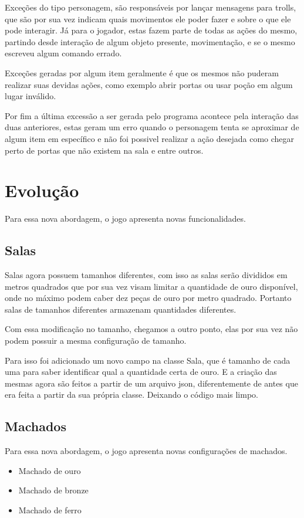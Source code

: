 \documentclass[runningheads,a4paper]{llncs}
\begin{document}
		Exceções do tipo personagem, são responsáveis por lançar mensagens para trolls, que são por sua vez indicam quais movimentos ele poder fazer e sobre o que ele pode interagir. Já para o jogador, estas fazem parte de todas as ações do mesmo, partindo desde interação de algum objeto presente, movimentação, e se o mesmo escreveu algum comando errado.
		
		Exceções geradas por algum item geralmente é que os mesmos não puderam realizar suas devidas ações, como exemplo abrir portas ou usar poção em algum lugar inválido.
		
		Por fim a última excessão a ser gerada pelo programa acontece pela interação das duas anteriores, estas geram um erro quando o personagem tenta se aproximar de algum item em específico e não foi possivel realizar a ação desejada como chegar perto de portas que não existem na sala e entre outros.

\section{Evolução}
	Para essa nova abordagem, o jogo apresenta novas funcionalidades.
	
	\subsection{Salas}
		Salas agora possuem tamanhos diferentes, com isso as salas serão divididos em metros quadrados que por sua vez visam limitar a quantidade de ouro disponível, onde no máximo podem caber dez peças de ouro por metro quadrado. Portanto salas de tamanhos diferentes armazenam quantidades diferentes.
		
		Com essa modificação no tamanho, chegamos a outro ponto, elas por sua vez não podem possuir a mesma configuração de tamanho.
		
		Para isso foi adicionado um novo campo na classe Sala, que é tamanho de cada uma para saber identificar qual a quantidade certa de ouro. E a criação das mesmas agora são feitos a partir de um arquivo json, diferentemente de antes que era feita a partir da sua própria classe. Deixando o código mais limpo.
		
	
	\subsection{Machados}
		Para essa nova abordagem, o jogo apresenta novas configurações de machados.
		\begin{itemize}
			\item Machado de ouro
			\item Machado de bronze
			\item Machado de ferro
		\end{itemize}
		
\end{document}
